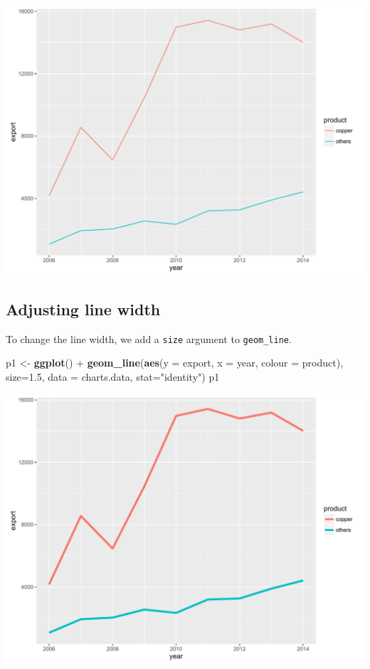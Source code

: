 \documentclass[]{article}
\newenvironment{Shaded}{\begin{snugshade}}{\end{snugshade}}
\newcommand{\KeywordTok}[1]{\textcolor[rgb]{0.13,0.29,0.53}{\textbf{{#1}}}}
\newcommand{\DataTypeTok}[1]{\textcolor[rgb]{0.13,0.29,0.53}{{#1}}}
\newcommand{\FloatTok}[1]{\textcolor[rgb]{0.00,0.00,0.81}{{#1}}}
\newcommand{\StringTok}[1]{\textcolor[rgb]{0.31,0.60,0.02}{{#1}}}
\newcommand{\NormalTok}[1]{{#1}}
\begin{document}
\begin{center}\includegraphics{0_all_posts_pdf/line_1-1} \end{center}

\subsection{Adjusting line width}\label{adjusting-line-width}

To change the line width, we add a \texttt{size} argument to
\texttt{geom\_line}.

\begin{Shaded}
\begin{Highlighting}[]
\NormalTok{p1 <-}\StringTok{ }\KeywordTok{ggplot}\NormalTok{() +}\StringTok{ }\KeywordTok{geom_line}\NormalTok{(}\KeywordTok{aes}\NormalTok{(}\DataTypeTok{y =} \NormalTok{export, }\DataTypeTok{x =} \NormalTok{year, }\DataTypeTok{colour =} \NormalTok{product), }\DataTypeTok{size=}\FloatTok{1.5}\NormalTok{, }
                           \DataTypeTok{data =} \NormalTok{charts.data, }\DataTypeTok{stat=}\StringTok{"identity"}\NormalTok{)}
\NormalTok{p1}
\end{Highlighting}
\end{Shaded}

\begin{center}\includegraphics{0_all_posts_pdf/line_2-1} \end{center}
\end{document}
